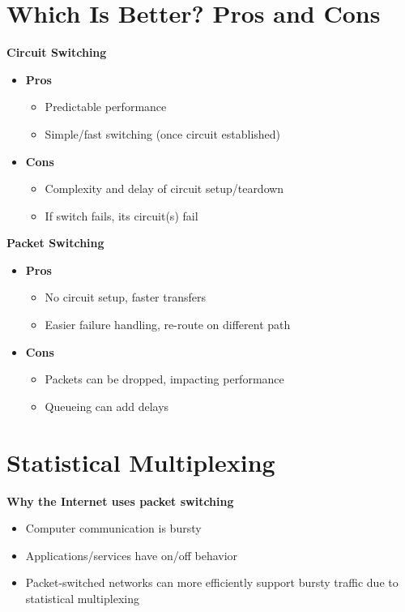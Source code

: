 \documentclass[9pt]{extarticle}
\begin{document}
\begin{multicols*}{3}
{\color{sectioncolor}\section*{\centering Which Is Better? Pros and Cons}}
\textbf{Circuit Switching}
\begin{itemize}
    \item \textbf{Pros}
    \begin{itemize}
        \item Predictable performance
        \item Simple/fast switching (once circuit established)
    \end{itemize}
    \item \textbf{Cons}
    \begin{itemize}
        \item Complexity and delay of circuit setup/teardown
        \item If switch fails, its circuit(s) fail
    \end{itemize}
\end{itemize}

\textbf{Packet Switching}
\begin{itemize}
    \item \textbf{Pros}
    \begin{itemize}
        \item No circuit setup, faster transfers
        \item Easier failure handling, re-route on different path
    \end{itemize}
    \item \textbf{Cons}
    \begin{itemize}
        \item Packets can be dropped, impacting performance
        \item Queueing can add delays
    \end{itemize}
\end{itemize}

{\color{sectioncolor}\section*{\centering Statistical Multiplexing}}
\textbf{Why the Internet uses packet switching}
\begin{itemize}
    \item Computer communication is bursty
    \item Applications/services have on/off behavior
    \item Packet-switched networks can more efficiently support bursty traffic due to statistical multiplexing
\end{itemize}


\end{multicols*}
\end{document}
